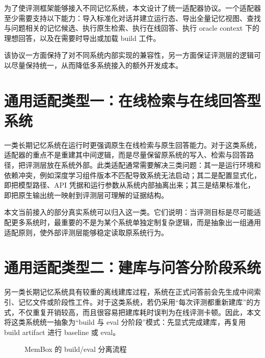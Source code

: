 为了使评测框架能够接入不同记忆系统，本文设计了统一适配器协议。一个适配器至少需要支持以下能力：导入标准化对话并建立运行态、导出全量记忆视图、查找与问题相关的记忆候选、执行原生检索、执行在线回答、执行 oracle context 下的理想回答，以及在需要时导出或加载 build 工件。

该协议一方面保持了对不同系统内部实现的兼容性，另一方面保证评测层的逻辑可以尽量保持统一，从而降低多系统接入的额外开发成本。

\section{通用适配类型一：在线检索与在线回答型系统}

一类长期记忆系统在运行时更强调原生在线检索与原生回答能力。对于这类系统，适配器的重点不是重建其中间逻辑，而是尽量保留原系统的写入、检索与回答路径，把评测层放在系统外部。此类适配通常需要解决三类问题：其一是运行环境和依赖冲突，例如深度学习组件版本不匹配导致系统无法启动；其二是配置显式化，即把模型路径、API 凭据和运行参数从系统内部抽离出来；其三是结果标准化，即把原生输出统一映射到评测层可理解的证据结构。

本文当前接入的部分真实系统可以归入这一类。它们说明：当评测目标是尽可能适配更多系统时，最重要的不是为某个系统单独定制复杂逻辑，而是抽象出一组通用适配原则，使外部评测层能够稳定读取原系统行为。

\section{通用适配类型二：建库与问答分阶段系统}

另一类长期记忆系统具有较重的离线建库过程，系统在正式问答前会先生成中间索引、记忆文件或阶段性工件。对于这类系统，若仍采用“每次评测都重新建库”的方式，不仅重复开销较高，而且很容易把建库耗时误判为在线评测卡顿。因此，本文将这类系统统一抽象为“build 与 eval 分阶段”模式：先显式完成建库，再复用 build artifact 进行 baseline 或 eval。

\begin{figure}[htbp]
\centering
{}
\caption{MemBox 的 build/eval 分离流程}
\label{fig:membox-build}
\end{figure}

